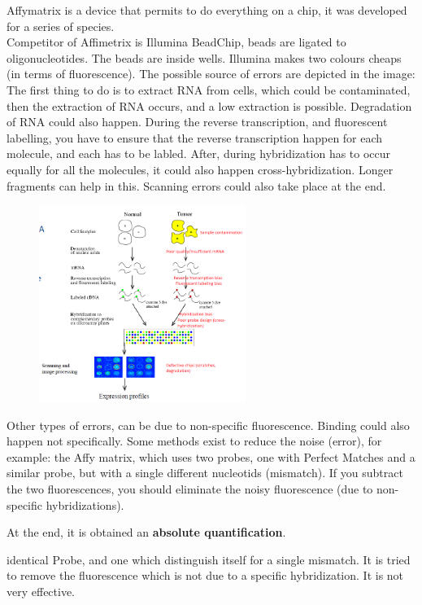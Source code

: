 Affymatrix is a device that permits to do everything on a chip, it was developed for a series of species.\\
Competitor of Affimetrix is Illumina BeadChip, beads are ligated to oligonucleotides. The beads are inside wells. Illumina makes two colours cheaps (in terms of fluorescence). The possible source of errors are depicted in the image:
The first thing to do is to extract RNA from cells, which could be contaminated, then the extraction of RNA occurs, and a low extraction is possible. Degradation of RNA could also happen. During the reverse transcription, and fluorescent labelling, you have to ensure that the reverse transcription happen for each molecule, and each has to be labled. After, during hybridization has to occur equally for all the molecules, it could also happen cross-hybridization. Longer fragments can help in this. Scanning errors could also take place at the end.

\begin{figure}[h]
\caption{}
\centering
\includegraphics[width=0.6\textwidth]{ProblemsMicarrays}
\end{figure}

Other types of errors, can be due to non-specific fluorescence. Binding could also happen not specifically. Some methods exist to reduce the noise (error), for example: the Affy matrix, which uses two probes, one with Perfect Matches and a similar probe, but with a single different nucleotids (mismatch). If you subtract the two fluorescences, you should eliminate the noisy fluorescence (due to non-specific hybridizations).

At the end, it is obtained an \textbf{absolute quantification}.

identical Probe, and one which distinguish itself for a single mismatch. It is tried to remove the fluorescence which is not due to a specific hybridization. It is not very effective. 

